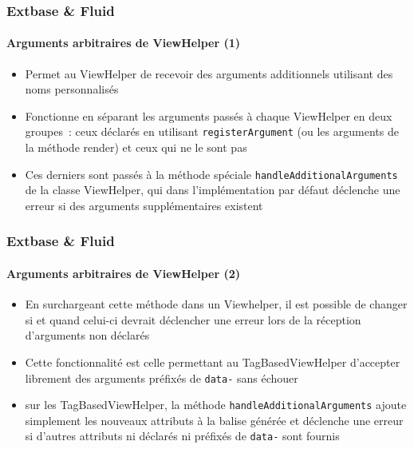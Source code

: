 \begin{frame}[fragile]
	\frametitle{Extbase \& Fluid}
	\framesubtitle{Arguments arbitraires de ViewHelper (1)}

	\begin{itemize}

		\item Permet au ViewHelper de recevoir des arguments additionnels utilisant
			des noms personnalisés

		\item Fonctionne en séparant les arguments passés à chaque ViewHelper en
			deux groupes~: ceux déclarés en utilisant \texttt{registerArgument}
			(ou les arguments de la méthode render) et ceux qui ne le sont pas

		\item Ces derniers sont passés à la méthode spéciale
			\texttt{handleAdditionalArguments}
			de la classe ViewHelper, qui dans l'implémentation par défaut déclenche
			une erreur si des arguments supplémentaires existent

	\end{itemize}

\end{frame}


\begin{frame}[fragile]
	\frametitle{Extbase \& Fluid}
	\framesubtitle{Arguments arbitraires de ViewHelper (2)}

	\begin{itemize}

		\item En surchargeant cette méthode dans un Viewhelper, il est possible de
			changer si et quand celui-ci devrait déclencher une erreur lors de la
			réception d'arguments non déclarés

		\item Cette fonctionnalité est celle permettant au TagBasedViewHelper
		 	d'accepter librement des arguments préfixés de \texttt{data-} sans échouer

		\item sur les TagBasedViewHelper, la méthode \texttt{handleAdditionalArguments}
			ajoute simplement les nouveaux attributs à la balise générée et déclenche une
			erreur si d'autres attributs ni déclarés ni préfixés de \texttt{data-} sont fournis

	\end{itemize}

\end{frame}

